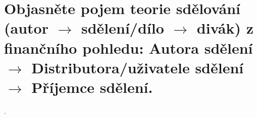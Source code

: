 \section{Objasněte pojem teorie sdělování (autor \texorpdfstring{$\rightarrow$}{→} sdělení/dílo 
\texorpdfstring{$\rightarrow$}{→} divák) z finančního pohledu: Autora sdělení \texorpdfstring{$\rightarrow$}{→} 
Distributora/uživatele sdělení \texorpdfstring{$\rightarrow$}{→} Příjemce sdělení.}.